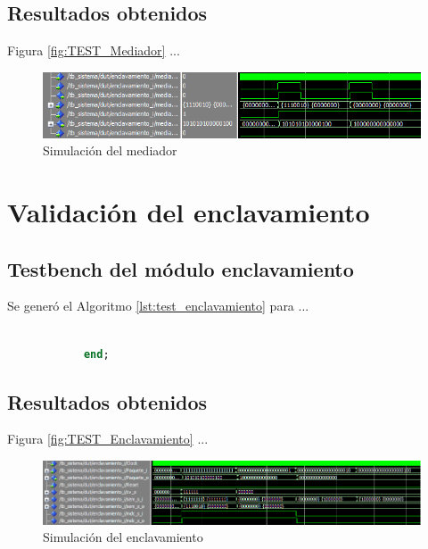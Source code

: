	\subsection{Resultados obtenidos}
				
		Figura \ref{fig:TEST_Mediador} ...
		
		\begin{figure}[h]
		\centering
		\includegraphics[scale=0.8]{./Figures/Test/Mediador}
			\caption{Simulación del mediador}
			\label{fig:Test_Mediador}
		\end{figure}
		
\section{Validación del enclavamiento}
	
	\subsection{Testbench del módulo enclavamiento}
			
		Se generó el Algoritmo \ref{lst:test_enclavamiento} para ...
		
			
		\begin{lstlisting}[language = vhdl,caption=Testbench del módulo enclavamiento,label={lst:test_enclavamiento}] 
				
			end;
		\end{lstlisting}
			
	\subsection{Resultados obtenidos}
				
		Figura \ref{fig:TEST_Enclavamiento} ...
		
		\begin{figure}[h]
		\centering
		\includegraphics[scale=0.65]{./Figures/Test/Enclavamiento}
			\caption{Simulación del enclavamiento}
			\label{fig:Test_Enclavamiento}
		\end{figure}
	
